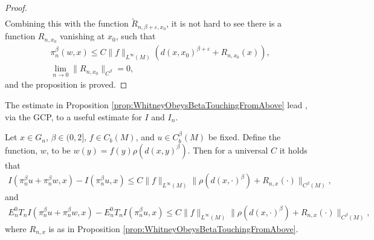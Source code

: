 \documentclass[11pt,reqno]{amsart}
\numberwithin{equation}{section}
\theoremstyle{plain}
\newcommand{\norm}[1]{\lVert#1\rVert}
\begin{document}
\begin{proof}
\begin{align*}
  \end{align*} 
  Combining this with the function $\tilde R_{n,\beta+\varepsilon,x_0}$, it is not hard to see there is a function $R_{n,x_0}$ vanishing at $x_0$, such that 
  \begin{align*}
    & \pi_n^\beta(w,x) \leq C\|f\|_{L^\infty(M)}\left ( d(x,x_0)^{\beta+\varepsilon}+R_{n,x_0} (x)\right ),\\
    & \lim \limits_{n\to 0}\|R_{n,x_0}\|_{C^\beta} = 0,
  \end{align*}	  
  and the proposition is proved.
\end{proof}

The estimate in Proposition \ref{prop:WhitneyObeysBetaTouchingFromAbove} lead , via the GCP, to a useful estimate for $I$ and $I_n$.

\begin{lem}\label{lem:IInRespectComparisonWithBetaGrowthFromAbove}
  Let $x\in G_n$, $\beta \in (0,2]$, $f\in C_b(M)$, and $u\in C^\beta_b(M)$ be fixed.  Define the function, $w$, to be $w(y)=f(y)\rho(d(x,y)^\beta)$. Then for a universal $C$ it holds that
  \begin{align*}
    I(\pi_n^\beta u+\pi_n^\beta w,x)- I(\pi_n^\beta u, x)
      \leq C\norm{f}_{L^\infty(M)}\norm{\rho(d(x,\cdot)^\beta)+R_{n,x}(\cdot)}_{C^\beta(M)},
  \end{align*}
  and
  \begin{align*}
    E_n^0T_nI(\pi_n^\beta u+\pi_n^\beta w,x)- E_n^0T_nI(\pi_n^\beta u, x)
      \leq C\norm{f}_{L^\infty(M)}\norm{\rho(d(x,\cdot)^\beta)+R_{n,x}(\cdot)}_{C^\beta(M)},
  \end{align*}
  where $R_{n,x}$ is as in Proposition \ref{prop:WhitneyObeysBetaTouchingFromAbove}.
\end{lem}
\end{document}
